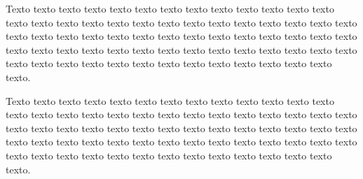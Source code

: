Texto texto texto texto texto texto texto texto texto texto texto texto texto texto texto texto texto texto texto texto texto texto texto texto texto texto texto texto texto texto texto texto texto texto texto texto texto texto texto texto texto texto texto texto texto texto texto texto texto texto texto texto texto texto texto texto texto texto texto texto texto texto texto texto texto texto texto texto texto.

Texto texto texto texto texto texto texto texto texto texto texto texto texto texto texto texto texto texto texto texto texto texto texto texto texto texto texto texto texto texto texto texto texto texto texto texto texto texto texto texto texto texto texto texto texto texto texto texto texto texto texto texto texto texto texto texto texto texto texto texto texto texto texto texto texto texto texto texto texto.